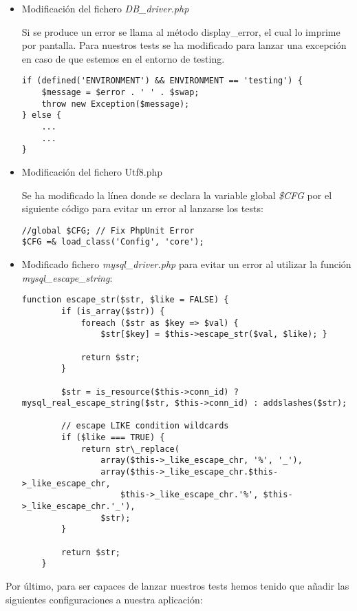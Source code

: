 \begin{itemize}

	\item Modificación del fichero \emph{DB\_driver.php}

		Si se produce un error se llama al método display\_error, el cual lo imprime por pantalla. Para nuestros tests se ha modificado para lanzar una excepción en caso de que estemos en el entorno de testing.

				\begin{lstlisting}
if (defined('ENVIRONMENT') && ENVIRONMENT == 'testing') {
	$message = $error . ' ' . $swap;
	throw new Exception($message);
} else {
	...
	...
}
				\end{lstlisting}

	\item Modificación del fichero Utf8.php

		Se ha modificado la línea donde se declara la variable global \emph{\$CFG} por el siguiente código para evitar un error al lanzarse los tests:

				\begin{lstlisting}
//global $CFG; // Fix PhpUnit Error
$CFG =& load_class('Config', 'core');
				\end{lstlisting}

	\item Modificado fichero \emph{mysql\_driver.php} para evitar un error al utilizar la función \emph{mysql\_escape\_string}:

				\begin{lstlisting}
function escape_str($str, $like = FALSE) {
		if (is_array($str)) {
			foreach ($str as $key => $val) {
				$str[$key] = $this->escape_str($val, $like); }

	   		return $str;
	   	}

	   	$str = is_resource($this->conn_id) ? mysql_real_escape_string($str, $this->conn_id) : addslashes($str);

		// escape LIKE condition wildcards
		if ($like === TRUE) {
			return str\_replace(
				array($this->_like_escape_chr, '%', '_'),
	      		array($this->_like_escape_chr.$this->_like_escape_chr,
      				$this->_like_escape_chr.'%', $this->_like_escape_chr.'_'),
	      		$str);
		}

		return $str;
	}
				\end{lstlisting}

\end{itemize}

Por último, para ser capaces de lanzar nuestros tests hemos tenido que añadir las siguientes configuraciones a nuestra aplicación:

